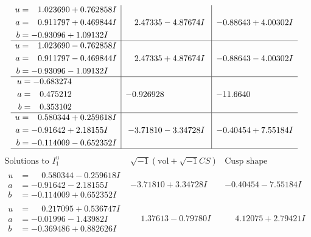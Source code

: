 \documentclass[1p]{elsarticle_modified}
\theoremstyle{definition}
\newcommand{\I}{\sqrt{-1}}
\begin{document}
$$\begin{array}{c|c|c}
\begin{aligned}
u &= \phantom{-}1.023690 + 0.762858 I \\
a &= \phantom{-}0.911797 + 0.469844 I \\
b &= -0.93096 + 1.09132 I\end{aligned}
 & \phantom{-}2.47335 - 4.87674 I & -0.88643 + 4.00302 I \\ \hline\begin{aligned}
u &= \phantom{-}1.023690 - 0.762858 I \\
a &= \phantom{-}0.911797 - 0.469844 I \\
b &= -0.93096 - 1.09132 I\end{aligned}
 & \phantom{-}2.47335 + 4.87674 I & -0.88643 - 4.00302 I \\ \hline\begin{aligned}
u &= -0.683274\phantom{ +0.000000I} \\
a &= \phantom{-}0.475212\phantom{ +0.000000I} \\
b &= \phantom{-}0.353102\phantom{ +0.000000I}\end{aligned}
 & -0.926928\phantom{ +0.000000I} & -11.6640\phantom{ +0.000000I} \\ \hline\begin{aligned}
u &= \phantom{-}0.580344 + 0.259618 I \\
a &= -0.91642 + 2.18155 I \\
b &= -0.114009 - 0.652352 I\end{aligned}
 & -3.71810 - 3.34728 I & -0.40454 + 7.55184 I\\
 \hline 
 \end{array}$$\newpage$$\begin{array}{c|c|c}  
\text{Solutions to }I^u_{1}& \I (\text{vol} + \sqrt{-1}CS) & \text{Cusp shape}\\
 \hline 
\begin{aligned}
u &= \phantom{-}0.580344 - 0.259618 I \\
a &= -0.91642 - 2.18155 I \\
b &= -0.114009 + 0.652352 I\end{aligned}
 & -3.71810 + 3.34728 I & -0.40454 - 7.55184 I \\ \hline\begin{aligned}
u &= \phantom{-}0.217095 + 0.536747 I \\
a &= -0.01996 - 1.43982 I \\
b &= -0.369486 + 0.882626 I\end{aligned}
 & \phantom{-}1.37613 - 0.79780 I & \phantom{-}4.12075 + 2.79421 I \\ \hline\begin{aligned}

\end{aligned}
\end{array}$$
\end{document}
